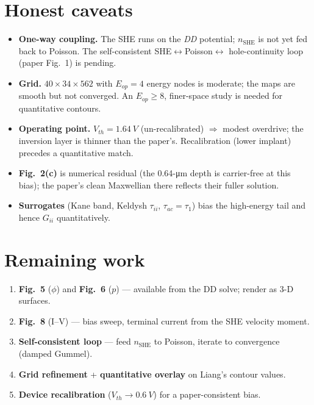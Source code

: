 \documentclass[11pt]{article}
\begin{document}
\section{Honest caveats}
\begin{itemize}[leftmargin=1.4em,itemsep=1pt]
\item \textbf{One-way coupling.} The SHE runs on the \emph{DD} potential; $n_{\text{SHE}}$
is not yet fed back to Poisson. The self-consistent SHE$\leftrightarrow$Poisson$\leftrightarrow$
hole-continuity loop (paper Fig.~1) is pending.
\item \textbf{Grid.} $40\times34\times562$ with $E_{op}=4$ energy nodes is moderate; the
maps are smooth but not converged. An $E_{op}\!\ge\!8$, finer-space study is needed for
quantitative contours.
\item \textbf{Operating point.} $V_{th}=\SI{1.64}{V}$ (un-recalibrated) $\Rightarrow$ modest
overdrive; the inversion layer is thinner than the paper's. Recalibration (lower implant)
precedes a quantitative match.
\item \textbf{Fig.~2(c)} is numerical residual (the 0.64-\si{\micro\meter} depth is
carrier-free at this bias); the paper's clean Maxwellian there reflects their fuller solution.
\item \textbf{Surrogates} (Kane band, Keldysh $\tau_{ii}$, $\tau_{ac}=\tau_1$) bias the
high-energy tail and hence $G_{ii}$ quantitatively.
\end{itemize}

\section{Remaining work}
\begin{enumerate}[leftmargin=1.5em,itemsep=1pt]
\item \textbf{Fig.~5} ($\phi$) and \textbf{Fig.~6} ($p$) --- available from the DD solve;
render as 3-D surfaces.
\item \textbf{Fig.~8} (I--V) --- bias sweep, terminal current from the SHE velocity moment.
\item \textbf{Self-consistent loop} --- feed $n_{\text{SHE}}$ to Poisson, iterate to
convergence (damped Gummel).
\item \textbf{Grid refinement} + \textbf{quantitative overlay} on Liang's contour values.
\item \textbf{Device recalibration} ($V_{th}\to\SI{0.6}{V}$) for a paper-consistent bias.
\end{enumerate}
\end{document}
